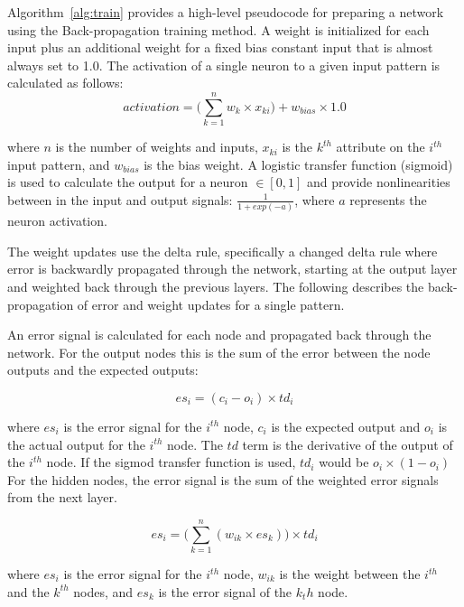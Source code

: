 Algorithm~\ref{alg:train} provides a high-level pseudocode for preparing a network using the Back-propagation training method. A weight is initialized for each input plus an additional weight for a fixed bias constant input that is almost always set to 1.0. The activation of a single neuron to a given input pattern is calculated as follows:
\begin{equation}
	activation = \bigg(\sum_{k=1}^{n} w_{k} \times x_{ki}\bigg) + w_{bias} \times 1.0
\end{equation}

where $n$ is the number of weights and inputs, $x_{ki}$ is the $k^{th}$ attribute on the $i^{th}$ input pattern, and $w_{bias}$ is the bias weight. A logistic transfer function (sigmoid) is used to calculate the output for a neuron $\in [0,1]$ and provide nonlinearities between in the input and output signals: $\frac{1}{1+exp(-a)}$, where $a$ represents the neuron activation. 

The weight updates use the delta rule, specifically a changed delta rule where error is backwardly propagated through the network, starting at the output layer and weighted back through the previous layers. The following describes the back-propagation of error and weight updates for a single pattern.

An error signal is calculated for each node and propagated back through the network. For the output nodes this is the sum of the error between the node outputs and the expected outputs: 

\begin{equation}
	es_i = (c_i - o_i) \times td_i
\end{equation}

where $es_i$ is the error signal for the $i^{th}$ node, $c_i$ is the expected output and $o_i$ is the actual output for the $i^{th}$ node. The $td$ term is the derivative of the output of the $i^{th}$ node. If the sigmod transfer function is used, $td_i$ would be $o_i \times (1-o_i)$ For the hidden nodes, the error signal is the sum of the weighted error signals from the next layer.

\begin{equation}
	es_i = \bigg(\sum_{k=1}^n (w_{ik} \times es_k)\bigg) \times td_i
\end{equation}

where $es_i$ is the error signal for the $i^{th}$ node, $w_{ik}$ is the weight between the $i^{th}$ and the $k^{th}$ nodes, and $es_k$ is the error signal of the $k_th$ node.

